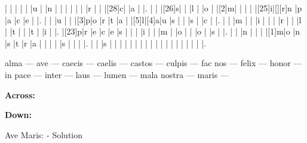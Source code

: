 \documentclass[12pt]{article}
\begin{document}
\begin{Puzzle}{22}{24}
  |{}  |{}  |{}  |{}  |{}  |u   |{}  |n   |{}  |{}  |{}  |{}  |{}  |{}  |r   |{}  |{}  |[28]c|{}  |a   |{}  |.
  |{}  |{}  |[26]s|{}  |{}  |l   |{}  |o   |{}  |[2]m|{}  |{}  |{}  |{}  |[25]i|[][r]n   |p   |a   |c   |e   |{}  |.
  |{}  |{}  |u   |{}  |{}  |[3]p|o   |r   |t   |a   |{}  |[5]l|[4]a|u   |s   |{}  |{}  |s   |{}  |c   |{}  |.
  |{}  |{}  |m   |{}  |{}  |i   |{}  |{}  |{}  |r   |{}  |{}  |l   |{}  |t   |{}  |{}  |t   |{}  |i   |{}  |.
  |[23]p|r   |e   |c   |e   |s   |{}  |{}  |{}  |i   |{}  |{}  |m   |{}  |o   |{}  |{}  |o   |{}  |s   |{}  |.
  |{}  |{}  |n   |{}  |{}  |{}  |[1]m|o   |n   |s   |t   |r   |a   |{}  |{}  |{}  |{}  |s   |{}  |{}  |{}  |.
  |{}  |{}  |s   |{}  |{}  |{}  |{}  |{}  |{}  |{}  |{}  |{}  |{}  |{}  |{}  |{}  |{}  |{}  |{}  |{}  |{}  |.
\end{Puzzle}
\begin{rotate}{90}
\small 
alma --- ave --- caecis  --- caelis --- castos --- culpis --- fac nos --- felix --- honor --- in pace --- inter --- laus --- lumen --- mala nostra --- maris ---
\end{rotate}
\hspace{-10pt}
\begin{PuzzleClues}{\textbf{Across:}}
\end{PuzzleClues}
\begin{PuzzleClues}{\textbf{Down:}}
\end{PuzzleClues}
\newpage
\begin{center}
  \huge{Ave Maris: - Solution}
\end{center}
\vspace{1.5cm}
\PuzzleSolution
\end{document}
